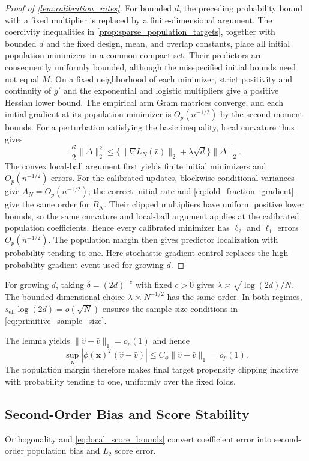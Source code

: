 \documentclass[12pt]{article}
\begin{document}
\begin{proof}[Proof of \cref{lem:calibration_rates}]
For bounded $d$, the preceding probability bound with a fixed multiplier is replaced by a finite-dimensional argument. The coercivity inequalities in \cref{prop:sparse_population_targets}, together with bounded $d$ and the fixed design, mean, and overlap constants, place all initial population minimizers in a common compact set. Their predictors are consequently uniformly bounded, although the misspecified initial bounds need not equal $M$. On a fixed neighborhood of each minimizer, strict positivity and continuity of $g'$ and the exponential and logistic multipliers give a positive Hessian lower bound. The empirical arm Gram matrices converge, and each initial gradient at its population minimizer is $O_p(n^{-1/2})$ by the second-moment bounds. For a perturbation satisfying the basic inequality, local curvature thus gives
\[
\frac\kappa2\|\Delta\|_2^2
\le\{\|\nabla L_N(\bar v)\|_2+\lambda\sqrt d\}\|\Delta\|_2.
\]
The convex local-ball argument first yields finite initial minimizers and $O_p(n^{-1/2})$ errors. For the calibrated updates, blockwise conditional variances give $A_N=O_p(n^{-1/2})$; the correct initial rate and \cref{eq:fold_fraction_gradient} give the same order for $B_N$. Their clipped multipliers have uniform positive lower bounds, so the same curvature and local-ball argument applies at the calibrated population coefficients. Hence every calibrated minimizer has $\ell_2$ and $\ell_1$ errors $O_p(n^{-1/2})$. The population margin then gives predictor localization with probability tending to one. Here stochastic gradient control replaces the high-probability gradient event used for growing $d$.
\end{proof}

For growing $d$, taking $\delta=(2d)^{-c}$ with fixed $c>0$ gives $\lambda\asymp\sqrt{\log(2d)/N}$. The bounded-dimensional choice $\lambda\asymp N^{-1/2}$ has the same order. In both regimes, $s_{\mathrm{eff}}\log(2d)=o(\sqrt N)$ ensures the sample-size conditions in \cref{eq:primitive_sample_size}.

The lemma yields $\|\widehat v-\bar v\|_1=o_p(1)$ and hence
\[
\sup_{\boldsymbol x}|\phi(\boldsymbol x)^T(\widehat v-\bar v)|
\le C_\phi\|\widehat v-\bar v\|_1=o_p(1).
\]
The population margin therefore makes final target propensity clipping inactive with probability tending to one, uniformly over the fixed folds.

\subsection{Second-Order Bias and Score Stability}\label{supp:pairwise_remainders}
Orthogonality and \cref{eq:local_score_bounds} convert coefficient error into second-order population bias and $L_2$ score error.
\end{document}
